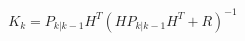 \documentclass[preview]{standalone}
\begin{document}
\begin{align*}
K_k = P_{k|k-1}H^T(HP_{k|k-1}H^T + R)^{-1}
\end{align*}
\end{document}
